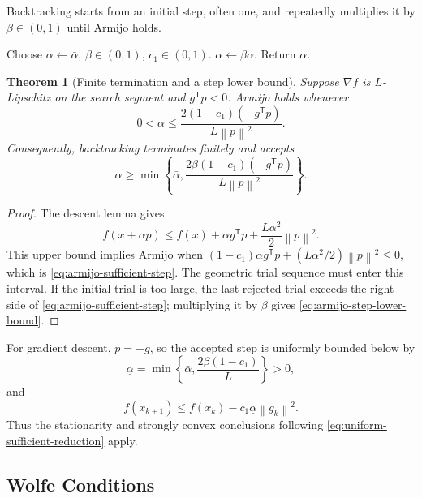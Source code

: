 \documentclass[12pt,oneside]{book}
\numberwithin{equation}{section}
\theoremstyle{definition}
\theoremstyle{plain}
\newtheorem{theorem}{Theorem}[section]
\theoremstyle{remark}
\newcommand{\norm}[1]{\left\lVert #1 \right\rVert}
\newcommand{\grad}{\nabla}
\begin{document}
Backtracking starts from an initial step, often one, and repeatedly multiplies
it by $\beta\in(0,1)$ until Armijo holds.

\begin{algorithm}[H]
\caption{Backtracking line search}
\begin{algorithmic}[1]
\State Choose $\alpha\gets\bar\alpha$, $\beta\in(0,1)$, $c_1\in(0,1)$.
\While{$f(x+\alpha p)>f(x)+c_1\alpha\grad f(x)^\mathsf Tp$}
  \State $\alpha\gets\beta\alpha$.
\EndWhile
\State Return $\alpha$.
\end{algorithmic}
\end{algorithm}

\begin{theorem}[Finite termination and a step lower bound]
Suppose $\grad f$ is $L$-Lipschitz on the search segment and $g^\mathsf Tp<0$.
Armijo holds whenever
\begin{equation}
 0<\alpha\leq
 \frac{2(1-c_1)(-g^\mathsf Tp)}{L\norm p^2}.
 \label{eq:armijo-sufficient-step}
\end{equation}
Consequently, backtracking terminates finitely and accepts
\begin{equation}
 \alpha\geq
 \min\left\{\bar\alpha,
 \frac{2\beta(1-c_1)(-g^\mathsf Tp)}{L\norm p^2}\right\}.
 \label{eq:armijo-step-lower-bound}
\end{equation}
\end{theorem}

\begin{proof}
The descent lemma gives
\[
 f(x+\alpha p)\leq f(x)+\alpha g^\mathsf Tp
 +\frac{L\alpha^2}{2}\norm p^2.
\]
This upper bound implies Armijo when
$(1-c_1)\alpha g^\mathsf Tp+(L\alpha^2/2)\norm p^2\leq0$, which is
\cref{eq:armijo-sufficient-step}. The geometric trial sequence must enter this
interval. If the initial trial is too large, the last rejected trial exceeds
the right side of \cref{eq:armijo-sufficient-step}; multiplying it by $\beta$
gives \cref{eq:armijo-step-lower-bound}.
\end{proof}

For gradient descent, $p=-g$, so the accepted step is uniformly bounded below
by
\[
 \underline\alpha
 =\min\left\{\bar\alpha,\frac{2\beta(1-c_1)}L\right\}>0,
\]
and
\[
 f(x_{k+1})\leq f(x_k)-c_1\underline\alpha\norm{g_k}^2.
\]
Thus the stationarity and strongly convex conclusions following
\cref{eq:uniform-sufficient-reduction} apply.

\subsection{Wolfe Conditions}
\end{document}
